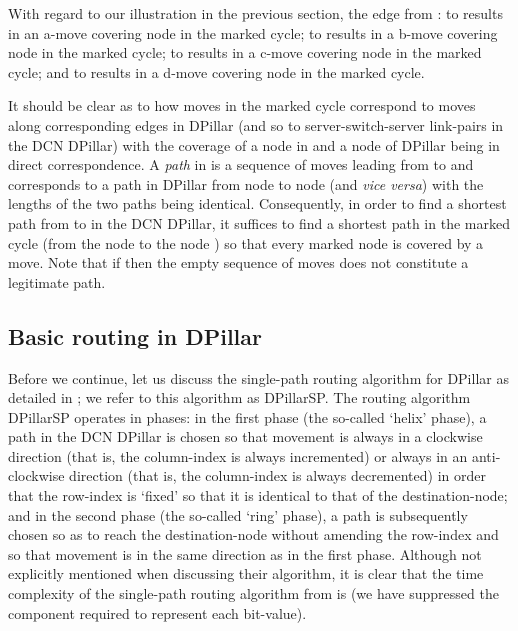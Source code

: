\documentclass{article}
\begin{document}
With regard to our illustration in the previous section, the edge from : to  results in an a-move covering node  in the marked cycle; to  results in a b-move covering node  in the marked cycle; to   results in a c-move covering node  in the marked cycle; and to  results in a d-move covering node  in the marked cycle.

It should be clear as to how moves in the marked cycle  correspond to moves along corresponding edges in DPillar (and so to server-switch-server link-pairs in the DCN DPillar) with the coverage of a node in  and a node of DPillar being in direct correspondence. A \emph{path\/} in  is a sequence of moves leading from  to  and corresponds to a path in DPillar from node  to node  (and \emph{vice versa\/}) with the lengths of the two paths being identical. Consequently, in order to find a shortest path from  to  in the DCN DPillar, it suffices to find a shortest path in the marked cycle  (from the node  to the node ) so that every marked node is covered by a move. Note that if  then the empty sequence of moves does not constitute a legitimate path.

\subsection{Basic routing in DPillar}

Before we continue, let us discuss the single-path routing algorithm for DPillar as detailed in \cite{LYY12}; we refer to this algorithm as DPillarSP. The routing algorithm DPillarSP operates in  phases: in the first phase (the so-called `helix' phase), a path in the DCN DPillar is chosen so that movement is always in a clockwise direction (that is, the column-index is always incremented) or always in an anti-clockwise direction (that is, the column-index is always decremented) in order that the row-index is `fixed' so that it is identical to that of the destination-node; and in the second phase (the so-called `ring' phase), a path is subsequently chosen so as to reach the destination-node without amending the row-index and so that movement is in the same direction as in the first phase. Although not explicitly mentioned when discussing their algorithm, it is clear that the time complexity of the single-path routing algorithm from \cite{LYY12} is  (we have suppressed the  component required to represent each bit-value).
\end{document}
